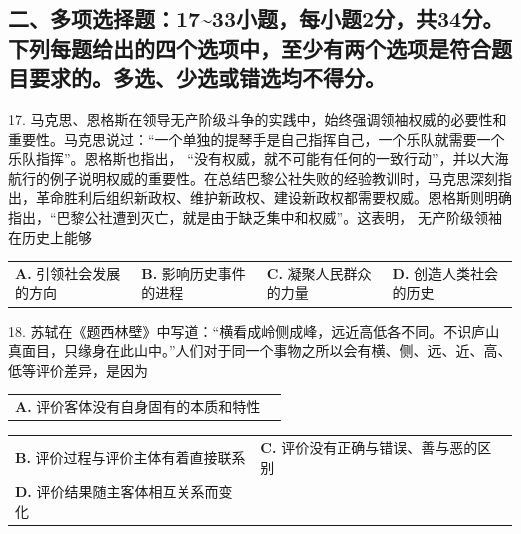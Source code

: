 \documentclass[UTF8,11pt]{ctexart}
\begin{document}
\subsection*{二、多项选择题：17\textasciitilde{}33小题，每小题2分，共34分。下列每题给出的四个选项中，至少有两个选项是符合题目要求的。多选、少选或错选均不得分。}

17. 马克思、恩格斯在领导无产阶级斗争的实践中，始终强调领袖权威的必要性和重要性。马克思说过：“一个单独的提琴手是自己指挥自己，一个乐队就需要一个乐队指挥”。恩格斯也指出， “没有权威，就不可能有任何的一致行动”，并以大海航行的例子说明权威的重要性。在总结巴黎公社失败的经验教训时，马克思深刻指出，革命胜利后组织新政权、维护新政权、建设新政权都需要权威。恩格斯则明确指出，“巴黎公社遭到灭亡，就是由于缺乏集中和权威”。这表明， 无产阶级领袖在历史上能够


\begin{center}\begin{tabular}{>{\raggedright\arraybackslash}p{\dimexpr(\linewidth-8\tabcolsep)/4\relax}>{\raggedright\arraybackslash}p{\dimexpr(\linewidth-8\tabcolsep)/4\relax}>{\raggedright\arraybackslash}p{\dimexpr(\linewidth-8\tabcolsep)/4\relax}>{\raggedright\arraybackslash}p{\dimexpr(\linewidth-8\tabcolsep)/4\relax}}
\textbf{A.} 引领社会发展的方向 & \textbf{B.} 影响历史事件的进程 & \textbf{C.} 凝聚人民群众的力量 & \textbf{D.} 创造人类社会的历史\\[.35em]\end{tabular}\end{center}

18. 苏轼在《题西林壁》中写道：“横看成岭侧成峰，远近高低各不同。不识庐山真面目，只缘身在此山中。”人们对于同一个事物之所以会有横、侧、远、近、高、低等评价差异，是因为


\begin{center}\begin{tabular}{>{\raggedright\arraybackslash}p{\dimexpr(\linewidth-4\tabcolsep)/2\relax}>{\raggedright\arraybackslash}p{\dimexpr(\linewidth-4\tabcolsep)/2\relax}}
\textbf{A.} 评价客体没有自身固有的本质和特性 & \\[.35em]\end{tabular}\end{center}

\begin{center}\begin{tabular}{>{\raggedright\arraybackslash}p{\dimexpr(\linewidth-4\tabcolsep)/2\relax}>{\raggedright\arraybackslash}p{\dimexpr(\linewidth-4\tabcolsep)/2\relax}}
\textbf{B.} 评价过程与评价主体有着直接联系 & \textbf{C.} 评价没有正确与错误、善与恶的区别\\[.35em]
\textbf{D.} 评价结果随主客体相互关系而变化 & \\[.35em]\end{tabular}\end{center}
\end{document}
